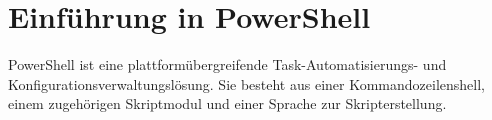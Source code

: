 \section{Einführung in PowerShell}
PowerShell ist eine plattformübergreifende Task-Automatisierungs- und Konfigurationsverwaltungslösung. Sie besteht aus einer Kommandozeilenshell, einem zugehörigen Skriptmodul und einer Sprache zur Skripterstellung.
